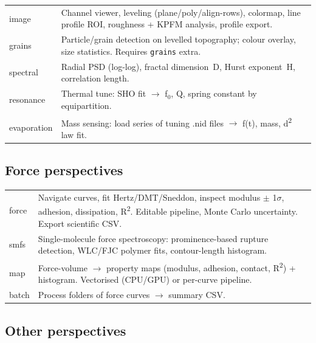 \documentclass[a4paper,11pt]{article}
\begin{document}
\begin{longtable}{@{}>{\ttfamily}l p{9cm}@{}}
\toprule
\multicolumn{2}{c}{\textbf{Module: image}}\\
\midrule
image & Channel viewer, leveling (plane/poly/align-rows), colormap, line profile ROI, roughness + KPFM analysis, profile export.\\
grains & Particle/grain detection on levelled topography; colour overlay, size statistics. Requires \texttt{grains} extra.\\
spectral & Radial PSD (log-log), fractal dimension~D, Hurst exponent~H, correlation length.\\
resonance & Thermal tune: SHO fit $\rightarrow$ f$_0$, Q, spring constant by equipartition.\\
evaporation & Mass sensing: load series of tuning .nid files $\rightarrow$ f(t), mass, d\textsuperscript{2} law fit.\\
\bottomrule
\end{longtable}

\subsection{Force perspectives}

\begin{longtable}{@{}>{\ttfamily}l p{9cm}@{}}
\toprule
\multicolumn{2}{c}{\textbf{Module: force}}\\
\midrule
force & Navigate curves, fit Hertz/DMT/Sneddon, inspect modulus $\pm$ 1$\sigma$, adhesion, dissipation, R\textsuperscript{2}. Editable pipeline, Monte Carlo uncertainty. Export scientific CSV.\\
smfs & Single-molecule force spectroscopy: prominence-based rupture detection, WLC/FJC polymer fits, contour-length histogram.\\
map & Force-volume $\rightarrow$ property maps (modulus, adhesion, contact, R\textsuperscript{2}) + histogram. Vectorised (CPU/GPU) or per-curve pipeline.\\
batch & Process folders of force curves $\rightarrow$ summary CSV.\\
\bottomrule
\end{longtable}

\subsection{Other perspectives}
\end{document}
